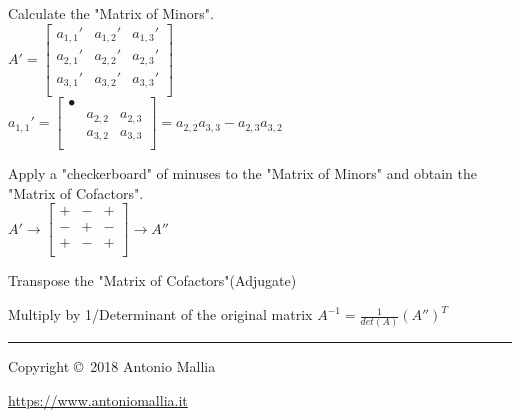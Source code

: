\documentclass[10pt,letterpaper]{article}
\begin{document}
\begin{multicols}{3}
Calculate the "Matrix of Minors".\\
$A' = \begin{bmatrix}
    a_{1,1}' & a_{1,2}' & a_{1,3}' \\
    a_{2,1}' & a_{2,2}' & a_{2,3}' \\
    a_{3,1}' & a_{3,2}' & a_{3,3}' \\
\end{bmatrix}$\\

$a_{1,1}' = \begin{bmatrix}
    \bullet &  &  \\
    	 & a_{2,2} & a_{2,3} \\
    	 & a_{3,2} & a_{3,3} \\
\end{bmatrix} = a_{2,2} a_{3,3} - a_{2,3}a_{3,2}$

Apply a "checkerboard" of minuses to the "Matrix of Minors" and obtain the "Matrix of Cofactors". \\
$A' \rightarrow \begin{bmatrix}
    + & - & + \\
    - & + & - \\
    + & - & + \\
\end{bmatrix} \rightarrow A''$

Transpose the "Matrix of Cofactors"(Adjugate)

Multiply by 1/Determinant of the original matrix
$A^{-1} = \frac{1}{det(A)} (A'')^T$
\smallskip
\rule{0.3\linewidth}{0.25pt}
\scriptsize

Copyright \copyright\ 2018 Antonio Mallia

\href{https://www.antoniomallia.it}{https://www.antoniomallia.it}

\end{multicols}
\end{document}
